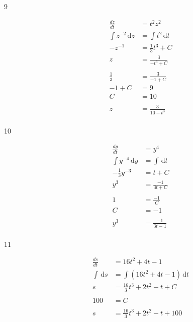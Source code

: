 \documentclass{exam}
\begin{document}
\begin{description}
\item[9]
\begin{align*}
  \frac{dz}{dt} &= t^2z^2 \\  
  \int z^{-2} \, \mathrm{d}z &= \int t^2 \, \mathrm{d}t \\
  -z^{-1} &= \frac{1}{3} t^3 + C \\
  z &= \frac{3}{-t^3 + C} \\
\\
  \frac{1}{3} &= \frac{3}{-1 + C} \\
  -1 + C &= 9 \\
  C &= 10 \\
\\
  z &= \frac{3}{10 - t^3} \\
\end{align*}

 \item[10]
\begin{align*}
  \frac{dy}{dt} &= y^4 \\  
  \int y^{-4}\, \mathrm{d}y &= \int \, \mathrm{d}t \\
  - \frac{1}{3} y^{-3} &= t + C \\
  y^3 &= \frac{-1}{3t + C} \\
\\
  1 &= \frac{-1}{C} \\
  C &= -1 \\
\\
  y^3 &= \frac{-1}{3t - 1} \\
\end{align*}

\item[11]
\begin{align*}
  \frac{ds}{dt} &= 16t^2 + 4t - 1 \\  
  \int \, \mathrm{d}s &= \int \left( 16t^2 + 4t - 1 \right) \, \mathrm{d}t \\
  s &= \frac{16}{3} t^3 + 2t^2 - t + C \\
\\
  100 &= C \\
\\
  s &= \frac{16}{3} t^3 + 2t^2 - t + 100 \\
\end{align*}


\end{description}
\end{document}
